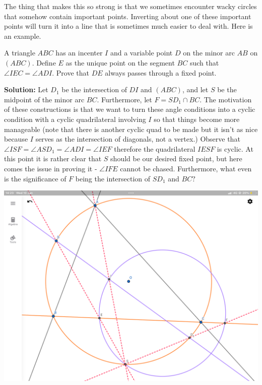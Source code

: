 \documentclass{scrartcl}
\begin{document}
The thing that makes this so strong is that we sometimes encounter wacky circles that somehow contain important points. Inverting about one of these important points will turn it into a line that is sometimes much easier to deal with. Here is an example. \newline
\begin{problem} A triangle $ABC$ has an incenter $I$ and a variable point $D$ on the minor arc $AB$ on $(ABC)$. Define $E$ as the unique point on the segment $BC$ such that $\angle IEC = \angle ADI$. Prove that $DE$ always passes through a fixed point.
\end{problem}
\textbf{Solution:} Let $D_1$ be the intersection of $DI$ and $(ABC)$, and let $S$ be the midpoint of the minor arc $BC$. Furthermore, let $F = SD_1 \cap BC$. The motivation of these constructions is that we want to turn these angle conditions into a cyclic condition with a cyclic quadrilateral involving $I$ so that things become more manageable (note that there is another cyclic quad to be made but it isn't as nice because $I$ serves as the intersection of diagonals, not a vertex.) Observe that $\angle ISF = \angle ASD_1 = \angle ADI = \angle IEF$ therefore the quadrilateral $IESF$ is cyclic. At this point it is rather clear that $S$ should be our desired fixed point, but here comes the issue in proving it - $\angle IFE$ cannot be chased. Furthermore, what even is the significance of $F$ being the intersection of $SD_1$ and $BC?$ \newline
\begin{center}
\includegraphics[scale=0.2]{IMG_4842.png}
\end{center}
\end{document}

